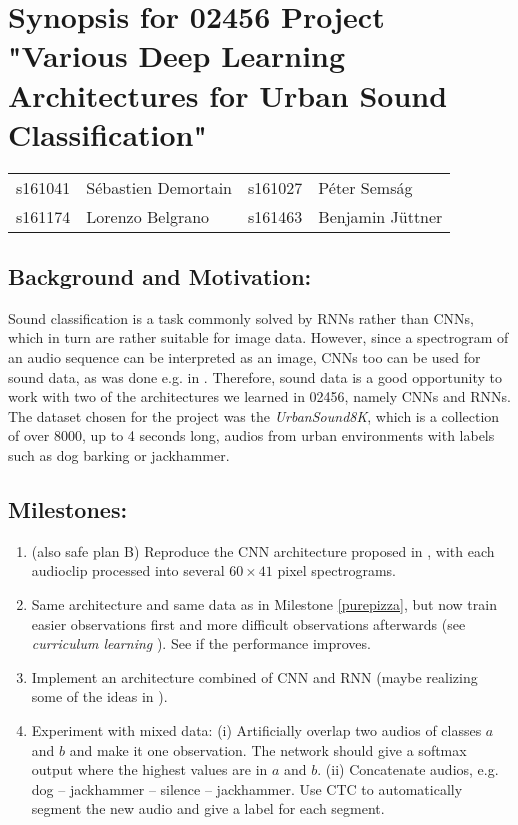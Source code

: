 \documentclass[utf-8]{article}
\newcommand{\urb}{\textit{UrbanSound8K}}
\begin{document}
\section*{Synopsis for 02456 Project "Various Deep Learning Architectures for Urban Sound Classification"}
\begin{tabular}{ll|ll}
s161041 &Sébastien Demortain &s161027 &Péter Semság\\
 s161174 &Lorenzo Belgrano &s161463 &Benjamin Jüttner
\end{tabular}

\subsection*{Background and Motivation:}
Sound classification is a task commonly solved by RNNs rather than CNNs, which in turn are rather suitable for image data. However, since a spectrogram of an audio sequence can be interpreted as an image, CNNs too can be used for sound data, as was done e.g. in \cite{pizza}. Therefore, sound data is a good opportunity to work with two of the architectures we learned in 02456, namely CNNs and RNNs. The dataset chosen for the project was the \urb\cite{urban}, which is a collection of over 8000, up to 4 seconds long, audios from urban environments with labels such as dog barking or jackhammer.  

\subsection*{Milestones:} %
\begin{enumerate}
\item (also safe plan B) Reproduce the CNN architecture proposed in \cite{pizza}, with each audioclip processed into several $60\times41$ pixel spectrograms.\label{purepizza}
\item Same architecture and same data as in Milestone \ref{purepizza}, but now train easier observations first and more difficult observations afterwards (see \textit{curriculum learning} \cite{curr}). See if the performance improves.
\item Implement an architecture combined of CNN and RNN (maybe realizing some of the ideas in \cite{deepspeech}).\label{cnnrnn} %
\item %
Experiment with mixed data:
(i) Artificially overlap two audios of classes $a$ and $b$ and make it one observation. The network should give a softmax output where the highest values are in $a$ and $b$.  
(ii) Concatenate audios, e.g. dog -- jackhammer -- silence -- jackhammer. Use CTC\cite{ctc, ctctf} to  automatically segment the new audio and give a label for each segment.  
\end{enumerate}
\end{document}
